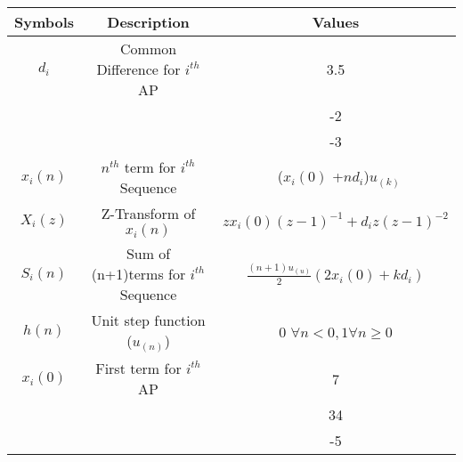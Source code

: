 \begin{center}
\begin{enumerate}
\begin{tabular}{ |c|c|c| } 
 \hline
Symbols & Description & Values  \\
 \hline
$d_i$ & Common Difference for $i^{th}$ AP & 3.5 \\ \cline{3-3}
 & & -2 \\ \cline{3-3}
 & & -3 \\ 
\hline

  $x_i(n)$ & $n^{th}$ term for $i^{th}$ Sequence & \ ($x_i(0)$ +$nd_i$)$u_{(k)}$\\
  \hline

   $X_i(z)$ & Z-Transform of $x_i(n)$ & $zx_i(0)(z-1)^{-1}+d_iz(z-1)^{-2}$ \\
   \hline

   $S_i(n)$ & Sum of (n+1)terms for $i^{th}$ Sequence & $\frac{(n+1)u_{(u)}}{2}(2x_i(0) + kd_i)$\\
   \hline

  $h(n)$ & Unit step function ($u_{(n)}$) & 0 $\forall n<0 , 1 \forall n \geq 0$\\
  \hline

  $x_i(0)$ & First term for $i^{th}$ AP & 7 \\ \cline{3-3}
 & & 34 \\ \cline{3-3}
 & & -5 \\ 
\hline
  
   \hline
\end{tabular}
\end{enumerate}
\centering
\captionsetup{Table 1 : Parameters , Descriptions And Values }
\label{table:ee25-tab1}
\end{center} 
